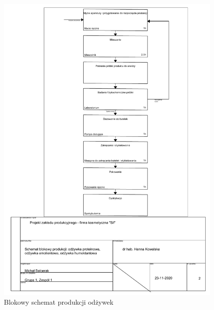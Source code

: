 \begin{figure}[H]
	\centering
	\includegraphics[height=0.9\textheight]{./sec5/odżywki.pdf}
	\caption{Blokowy schemat produkcji odżywek}
\end{figure}
